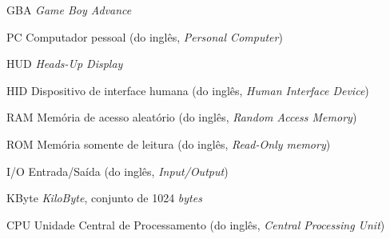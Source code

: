 \begin{siglas}
  \item[GBA] \textit{Game Boy Advance}
  \item[PC] Computador pessoal (do inglês, \textit{Personal Computer})
  \item[HUD] \textit{Heads-Up Display}
  \item[HID] Dispositivo de interface humana (do inglês, \textit{Human Interface Device})
  \item[RAM] Memória de acesso aleatório (do inglês, \textit{Random Access Memory})
  \item[ROM] Memória somente de leitura (do inglês, \textit{Read-Only memory})
  \item[I/O] Entrada/Saída (do inglês, \textit{Input/Output})
  \item[KByte] \textit{KiloByte}, conjunto de 1024 \textit{bytes}
  \item[CPU] Unidade Central de Processamento (do inglês, \textit{Central Processing Unit})
\end{siglas}
